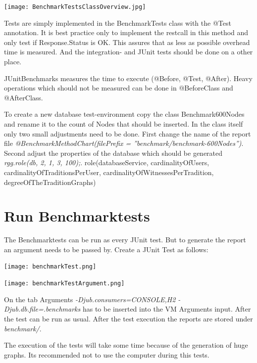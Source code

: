 \documentclass[11pt,fleqn,openany]{book} %
\begin{document}
\begin{center}
\texttt{[image: BenchmarkTestsClassOverview.jpg]} 
\end{center}

Tests are simply implemented in the BenchmarkTests class with the @Test annotation. It is best practice only to implement the restcall in this method and only test if Response.Status is OK. This assures that as less as possible overhead time is measured. And the integration- and JUnit tests should be done on a other place.

\begin{remark}
JUnitBenchmarks measures the time to execute (@Before, @Test, @After). Heavy operations which should not be measured can be done in @BeforeClass and @AfterClass.
\end{remark}

To create a new database test-environment copy the class Benchmark600Nodes and rename it to the count of Nodes that should be inserted. In the class itself only two small adjustments need to be done. First change the name of the report file \textit{@BenchmarkMethodChart(filePrefix = ''benchmark/benchmark-600Nodes'')}. Second adjust the properties of the database which should be generated \textit{rgg.role(db, 2, 1, 3, 100);}. role(databaseService, cardinalityOfUsers, cardinalityOfTraditionsPerUser, cardinalityOfWitnessesPerTradition, degreeOfTheTraditionGraphs)

\section*{Run Benchmarktests}
The Benchmarktests can be run as every JUnit test. But to generate the report an argument needs to be passed by. 
Create a JUnit Test as follows:

\begin{center}
\texttt{[image: benchmarkTest.png]} 
\end{center}

\begin{center}
\texttt{[image: benchmarkTestArgument.png]} 
\end{center}

On the tab Arguments \textit{-Djub.consumers=CONSOLE,H2 -Djub.db.file=.benchmarks} has to be inserted into the VM Arguments input. After the test can be run as usual. After the test execution the reports are stored under \textit{benchmark/}.
 
\begin{remark}
The execution of the tests will take some time because of the generation of huge graphs. Its recommended not to use the computer during this tests.  
\end{remark}
\end{document}
